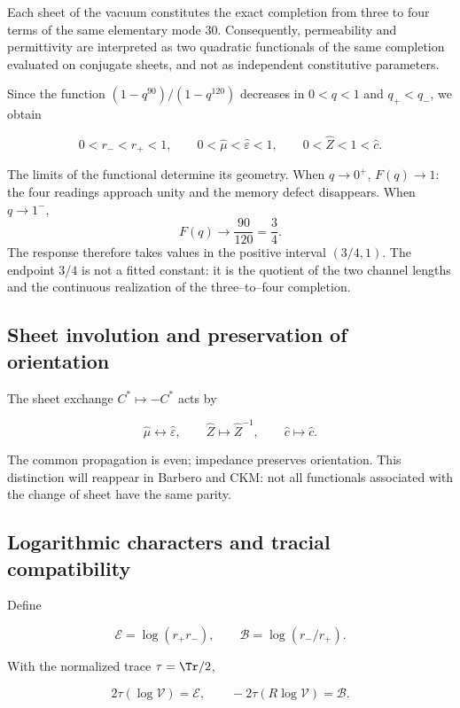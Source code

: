 Each sheet of the vacuum constitutes the exact completion from three to four
terms of the same elementary mode \(30\). Consequently, permeability
and permittivity are interpreted as two quadratic functionals of the same
completion evaluated on conjugate sheets, and not as independent
constitutive parameters.

Since the function \((1-q^{90})/(1-q^{120})\) decreases in \(0<q<1\) and \(q_+<q_-\), we obtain

\[
0<r_-<r_+<1,\qquad
0<\widehat\mu<\widehat\varepsilon<1,\qquad
0<\widehat Z<1<\widehat c.
\]

The limits of the functional determine its geometry. When \(q\to0^+\),
\(F(q)\to1\): the four readings approach unity and the memory
defect disappears. When \(q\to1^-\),
\[
F(q)\longrightarrow\frac{90}{120}=\frac34.
\]
The response therefore takes values in the positive interval \((3/4,1)\). The
endpoint \(3/4\) is not a fitted constant: it is the quotient of the two
channel lengths and the continuous realization of the
three--to--four completion.

\subsection{Sheet involution and preservation of orientation}

The sheet exchange \(C^*\mapsto-C^*\) acts by

\begin{equation}
\widehat\mu\longleftrightarrow\widehat\varepsilon,\qquad
\widehat Z\longmapsto\widehat Z^{-1},
\qquad
\widehat c\longmapsto\widehat c.
\label{p12-83-c13-s1:eq:vacuum-sheet}
\end{equation}

The common propagation is even; impedance preserves orientation.
This distinction will reappear in Barbero and CKM: not all functionals
associated with the change of sheet have the same parity.

\subsection{Logarithmic characters and tracial compatibility}

Define

\[
\mathcal E=\log(r_+r_-),\qquad
\mathcal B=\log(r_-/r_+).
\]

With the normalized trace \(\tau=\Tr/2\),

\begin{equation}
2\tau(\log\mathcal V)=\mathcal E,
\qquad
-2\tau(R\log\mathcal V)=\mathcal B.
\label{p12-83-c13-s1:eq:vacuum-traces}
\end{equation}


